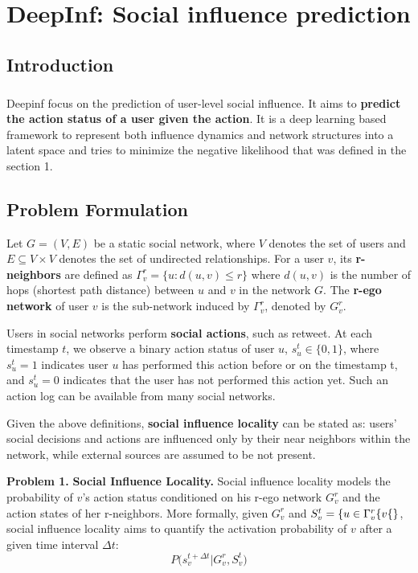 \chapter{DeepInf: Social influence prediction}


\section{Introduction}
\paragraph{} Deepinf focus on the prediction of user-level social influence. It aims to \textbf{predict the action status of a user given the action}.
It is a deep learning based framework to represent both influence dynamics and network structures into a latent space and 
tries to minimize the negative likelihood that was defined in the section 1.

\section{Problem Formulation}
Let $G=(V,E)$ be a static social network, where $V$ denotes the set of users and $E \subseteq V \times V$ denotes the set of undirected relationships. For a user $v$, its \textbf{r-neighbors} are defined as $\Gamma^r_v = \{u: d(u,v) \le r\}$ where $d(u,v)$ is the number of hops (shortest path distance) between $u$ and $v$ in the network $G$. The \textbf{r-ego network} of user $v$ is the sub-network induced by $\Gamma^r_v$, denoted by $G^r_v$.

Users in social networks perform \textbf{social actions}, such as retweet. At each timestamp $t$, we observe a binary action status of user $u$, $s_u^t \in \{0,1\}$, where $s_u^t=1$ indicates user $u$ has performed this action before or on the timestamp t, and $s_u^t=0$ indicates that the user has not performed this action yet. Such an action log can be available from many social networks.

Given the above definitions, \textbf{social influence locality} can be stated as: users' social decisions and actions are influenced only by their near neighbors within the network, while external sources are assumed to be not present.

\textbf{Problem 1.} \textbf{Social Influence Locality.} Social influence locality models the probability of $v$'s action status conditioned on his r-ego network $G^r_v$ and the action states of her r-neighbors. More formally, given $G^r_v$ and $S^t_v=\{u\in\Gamma_v^r \\ \{v\{\}$, social influence locality aims to quantify the activation probability of $v$ after a given time interval $\Delta t$: $$P\big(s_v^{t+\Delta t} \vert G^r_v, S^t_v\big)$$

